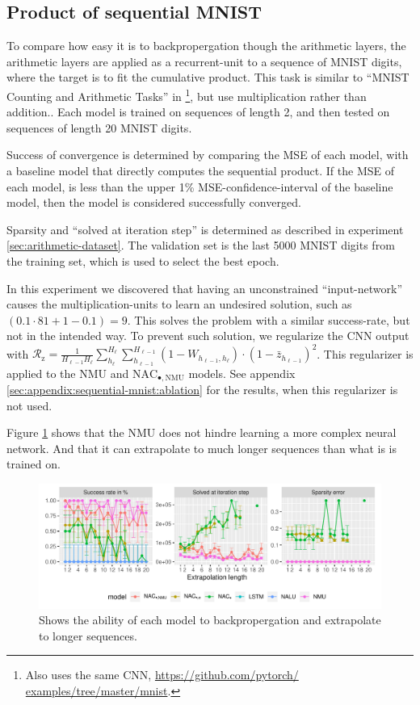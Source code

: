 \subsection{Product of sequential MNIST}

To compare how easy it is to backpropergation though the arithmetic layers, the arithmetic layers are applied as a recurrent-unit to a sequence of MNIST digits, where the target is to fit the cumulative product. This task is similar to ``MNIST Counting and Arithmetic Tasks'' in \cite{trask-nalu}\footnote{Also uses the same CNN, \url{https://github.com/pytorch/
examples/tree/master/mnist}.}, but use multiplication rather than addition.. Each model is trained on sequences of length 2, and then tested on sequences of length 20 MNIST digits.

Success of convergence is determined by comparing the MSE of each model, with a baseline model that directly computes the sequential product. If the MSE of each model, is less than the upper 1\% MSE-confidence-interval of the baseline model, then the model is considered successfully converged.

Sparsity and ``solved at iteration step'' is determined as described in experiment \ref{sec:arithmetic-dataset}. The validation set is the last 5000 MNIST digits from the training set, which is used to select the best epoch.

In this experiment we discovered that having an unconstrained ``input-network'' causes the multiplication-units to learn an undesired solution, such as $(0.1 \cdot 81 + 1 - 0.1) = 9$. This solves the problem with a similar success-rate, but not in the intended way. To prevent such solution, we regularize the CNN output with $\mathcal{R}_{\mathrm{z}} = \frac{1}{H_{\ell-1} H_\ell} \sum_{h_\ell}^{H_\ell} \sum_{h_{\ell-1}}^{H_{\ell-1}} (1 - W_{h_{\ell-1},h_\ell}) \cdot (1 - \bar{z}_{h_{\ell-1}})^2$. This regularizer is applied to the NMU and $\mathrm{NAC}_{\bullet,\mathrm{NMU}}$ models. See appendix \ref{sec:appendix:sequential-mnist:ablation} for the results, when this regularizer is not used.

Figure \ref{fig:sequential-mnist-prod-results} shows that the NMU does not hindre learning a more complex neural network. And that it can extrapolate to much longer sequences than what is is trained on.

\begin{figure}[h]
\centering
\includegraphics[width=\linewidth,trim={0 0.5cm 0 0},clip]{results/sequential_mnist_prod_long_short.pdf}
\caption{Shows the ability of each model to backpropergation and extrapolate to longer sequences.} 
\label{fig:sequential-mnist-prod-results}
\end{figure}
